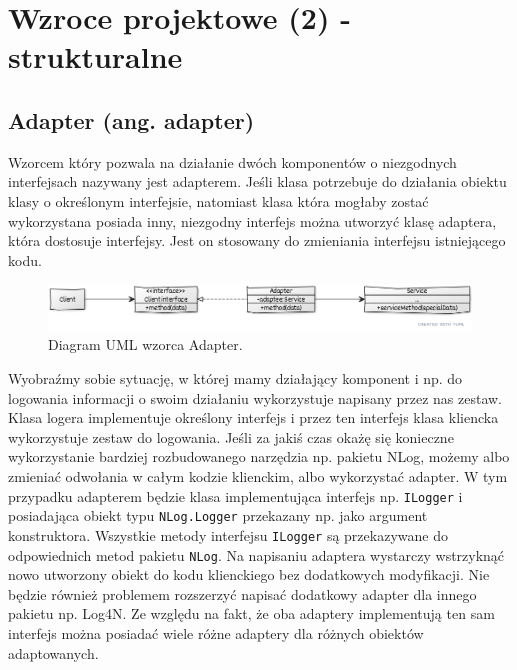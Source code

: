 \section{Wzroce projektowe (2) - strukturalne}

\subsection{Adapter (ang. adapter)}

Wzorcem który pozwala na działanie dwóch komponentów o niezgodnych interfejsach nazywany jest adapterem. Jeśli klasa potrzebuje do działania obiektu klasy o określonym interfejsie, natomiast klasa która mogłaby zostać wykorzystana posiada inny, niezgodny interfejs można utworzyć klasę adaptera, która dostosuje interfejsy. Jest on stosowany do zmieniania interfejsu istniejącego kodu.

\begin{figure}[hbt!]
	\centering
	\includegraphics[width=0.9\linewidth]{images/AdapterUml}
	\caption{Diagram UML wzorca Adapter.}
	\label{lab3/fig/AdapterUml}
\end{figure}
%

Wyobraźmy sobie sytuację, w której mamy działający komponent i np. do logowania informacji o swoim działaniu wykorzystuje napisany przez nas zestaw. Klasa logera implementuje określony interfejs i przez ten interfejs klasa kliencka wykorzystuje zestaw do logowania. Jeśli za jakiś czas okażę się konieczne wykorzystanie bardziej rozbudowanego narzędzia np. pakietu NLog, możemy albo zmieniać odwołania w całym kodzie klienckim, albo wykorzystać adapter. W tym przypadku adapterem będzie klasa implementująca interfejs np. \texttt{ILogger} i posiadająca obiekt typu \texttt{NLog.Logger} przekazany np. jako argument konstruktora. Wszystkie metody interfejsu \texttt{ILogger} są przekazywane do odpowiednich metod pakietu \texttt{NLog}. Na napisaniu adaptera wystarczy wstrzyknąć nowo utworzony obiekt do kodu klienckiego bez dodatkowych modyfikacji. Nie będzie również problemem rozszerzyć napisać dodatkowy adapter dla innego pakietu np. Log4N. Ze względu na fakt, że oba adaptery implementują ten sam interfejs można posiadać wiele różne adaptery dla różnych obiektów adaptowanych.

